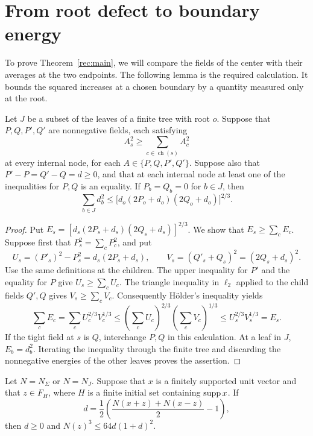 \section{From root defect to boundary energy}\label{rec:energy}

To prove Theorem~\ref{rec:main}, we will compare the fields of the
center with their averages at the two endpoints. The following lemma
is the required calculation. It bounds the squared increases at a
chosen boundary by a quantity measured only at the root.

\begin{lemma}\label{rec:two-field}
Let $J$ be a subset of the leaves of a finite tree with root $o$. Suppose that
$P,Q,P',Q'$ are nonnegative fields, each satisfying
\[
 A_s^2\ge\sum_{c\in\operatorname{ch}(s)}A_c^2
\]
at every internal node, for each $A\in\{P,Q,P',Q'\}$. Suppose also that $P'-P=Q'-Q=d\ge0$, and
that at each internal node at least one of the inequalities for $P,Q$
is an equality. If $P_b=Q_b=0$ for $b\in J$, then
\[
 \sum_{b\in J}d_b^2
 \le\bigl[d_o(2P_o+d_o)(2Q_o+d_o)\bigr]^{2/3}.
\]
\end{lemma}

\begin{proof}
Put $E_s=[d_s(2P_s+d_s)(2Q_s+d_s)]^{2/3}$. We show that
$E_s\ge\sum_c E_c$. Suppose first that $P_s^2=\sum_cP_c^2$, and put
\[
 U_s=(P'_s)^2-P_s^2=d_s(2P_s+d_s),\qquad
 V_s=(Q'_s+Q_s)^2=(2Q_s+d_s)^2.
\]
Use the same definitions at the children. The upper inequality for
$P'$ and the equality for $P$ give $U_s\ge\sum_c U_c$. The triangle
inequality in $\ell_2$ applied to the child fields $Q',Q$ gives
$V_s\ge\sum_c V_c$. Consequently H\"older's inequality yields
\[
 \sum_c E_c=\sum_c U_c^{2/3}V_c^{1/3}
 \le\left(\sum_c U_c\right)^{2/3}
     \left(\sum_c V_c\right)^{1/3}
 \le U_s^{2/3}V_s^{1/3}=E_s.
\]
If the tight field at $s$ is $Q$, interchange $P,Q$ in this calculation.
At a leaf in $J$, $E_b=d_b^2$. Iterating the inequality through the
finite tree and discarding the nonnegative energies of the other leaves
proves the assertion.
\end{proof}

\begin{lemma}\label{rec:root-sum-stability}
Let $N=N_\Sigma$ or $N=N_J$. Suppose that $x$ is a finitely supported
unit vector and that $z\in F_H$, where $H$ is a finite initial set
containing $\operatorname{supp} x$. If
\[
 d=\frac12\left(\frac{N(x+z)+N(x-z)}2-1\right),
\]
then $d\ge0$ and $N(z)^3\le64d(1+d)^2$.
\end{lemma}


